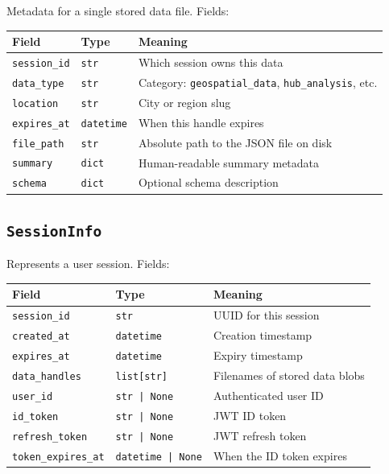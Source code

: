 \documentclass[12pt,a4paper]{report}
\begin{document}
Metadata for a single stored data file. Fields:

\begin{center}
\begin{tabularx}{\linewidth}{llX}
  \toprule
  \textbf{Field} & \textbf{Type} & \textbf{Meaning} \\
  \midrule
  \texttt{session\_id}  & \texttt{str}      & Which session owns this data \\
  \texttt{data\_type}   & \texttt{str}      & Category: \texttt{geospatial\_data}, \texttt{hub\_analysis}, etc. \\
  \texttt{location}     & \texttt{str}      & City or region slug \\
  \texttt{expires\_at}  & \texttt{datetime} & When this handle expires \\
  \texttt{file\_path}   & \texttt{str}      & Absolute path to the JSON file on disk \\
  \texttt{summary}      & \texttt{dict}     & Human-readable summary metadata \\
  \texttt{schema}       & \texttt{dict}     & Optional schema description \\
  \bottomrule
\end{tabularx}
\end{center}

\subsection{\texttt{SessionInfo}}

Represents a user session. Fields:

\begin{center}
\begin{tabularx}{\linewidth}{llX}
  \toprule
  \textbf{Field} & \textbf{Type} & \textbf{Meaning} \\
  \midrule
  \texttt{session\_id}       & \texttt{str}           & UUID for this session \\
  \texttt{created\_at}       & \texttt{datetime}      & Creation timestamp \\
  \texttt{expires\_at}       & \texttt{datetime}      & Expiry timestamp \\
  \texttt{data\_handles}     & \texttt{list[str]}     & Filenames of stored data blobs \\
  \texttt{user\_id}          & \texttt{str | None}    & Authenticated user ID \\
  \texttt{id\_token}         & \texttt{str | None}    & JWT ID token \\
  \texttt{refresh\_token}    & \texttt{str | None}    & JWT refresh token \\
  \texttt{token\_expires\_at} & \texttt{datetime | None} & When the ID token expires \\
  \bottomrule
\end{tabularx}
\end{center}
\end{document}
